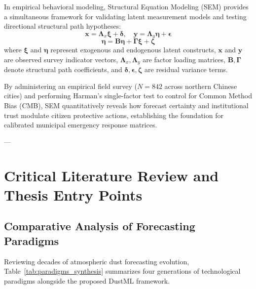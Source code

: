 In empirical behavioral modeling, Structural Equation Modeling (SEM) provides a simultaneous framework for validating latent measurement models and testing directional structural path hypotheses:
\begin{equation}
\label{eq:sem_measurement}
\mathbf{x} = \mathbf{\Lambda}_x \boldsymbol{\xi} + \boldsymbol{\delta}, \quad \mathbf{y} = \mathbf{\Lambda}_y \boldsymbol{\eta} + \boldsymbol{\epsilon}
\end{equation}
\begin{equation}
\label{eq:sem_structural}
\boldsymbol{\eta} = \mathbf{B} \boldsymbol{\eta} + \mathbf{\Gamma} \boldsymbol{\xi} + \boldsymbol{\zeta}
\end{equation}
where $\boldsymbol{\xi}$ and $\boldsymbol{\eta}$ represent exogenous and endogenous latent constructs, $\mathbf{x}$ and $\mathbf{y}$ are observed survey indicator vectors, $\mathbf{\Lambda}_x, \mathbf{\Lambda}_y$ are factor loading matrices, $\mathbf{B}, \mathbf{\Gamma}$ denote structural path coefficients, and $\boldsymbol{\delta}, \boldsymbol{\epsilon}, \boldsymbol{\zeta}$ are residual variance terms.

By administering an empirical field survey ($N=842$ across northern Chinese cities) and performing Harman's single-factor test to control for Common Method Bias (CMB), SEM quantitatively reveals how forecast certainty and institutional trust modulate citizen protective actions, establishing the foundation for calibrated municipal emergency response matrices.

---

\section{Critical Literature Review and Thesis Entry Points}
\label{sec:literature_gaps_synthesis}

\subsection{Comparative Analysis of Forecasting Paradigms}
\label{subsec:paradigms_comparison}

Reviewing decades of atmospheric dust forecasting evolution, Table~\ref{tab:paradigms_synthesis} summarizes four generations of technological paradigms alongside the proposed DustML framework.

